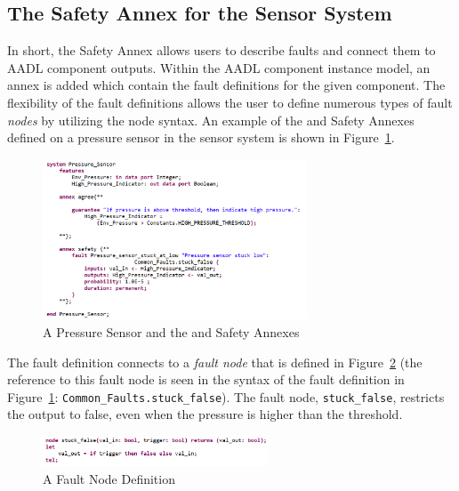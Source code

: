 \subsection{The Safety Annex for the Sensor System}
In short, the Safety Annex allows users to describe faults and connect them to AADL component outputs. Within the AADL component instance model, an annex is added which contain the fault definitions for the given component. The flexibility of the fault definitions allows the user to define numerous types of fault \textit{nodes} by utilizing the \agree node syntax. An example of the \agree and Safety Annexes defined on a pressure sensor in the sensor system is shown in Figure~\ref{fig:annexes}. 
\begin{figure}[h]
	\centering
	\includegraphics[width=0.7\textwidth]{images/sensorAnnexes.PNG}
	\caption{A Pressure Sensor and the \agree and Safety Annexes}
	\label{fig:annexes}
\end{figure}
The fault definition connects to a \textit{fault node} that is defined in Figure~\ref{fig:node} (the reference to this fault node is seen in the syntax of the fault definition in Figure~\ref{fig:annexes}: \texttt{Common\_Faults.stuck\_false}). The fault node, \texttt{stuck\_false}, restricts the output to false, even when the pressure is higher than the threshold.
\begin{figure}[h]
	\centering
	\includegraphics[width=0.6\textwidth]{images/sensorNode.PNG}
	\caption{A Fault Node Definition}
	\label{fig:node}
\end{figure}

